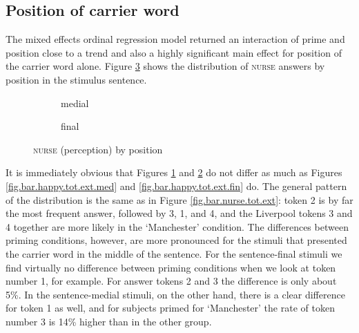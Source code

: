 \subsection{Position of carrier word}
\label{sec.perc_res.nurse.position}

The mixed effects ordinal regression model returned an interaction of prime and position close to a trend and also a highly significant main effect for position of the carrier word alone.
Figure \ref{fig.bar.nurse.tot.ext.pos} shows the distribution of \textsc{nurse} answers by position in the stimulus sentence.

\begin{figure}[h]
	\centering
	\begin{subfigure}{0.49\textwidth}
		\centering
			\resizebox{\linewidth}{!}{} 
		\caption{medial}
		\label{fig.bar.nurse.tot.ext.med}
	\end{subfigure}
	\begin{subfigure}{0.49\textwidth}
		\centering
			\resizebox{\linewidth}{!}{} 
		\caption{final}
		\label{fig.bar.nurse.tot.ext.fin}
	\end{subfigure}
	\caption{\textsc{nurse} (perception) by position}
	\label{fig.bar.nurse.tot.ext.pos}
\end{figure}

It is immediately obvious that Figures \ref{fig.bar.nurse.tot.ext.med} and \ref{fig.bar.nurse.tot.ext.fin} do not differ as much as Figures \ref{fig.bar.happy.tot.ext.med} and \ref{fig.bar.happy.tot.ext.fin} do.
The general pattern of the distribution is the same as in Figure \ref{fig.bar.nurse.tot.ext}: token 2 is by far the most frequent answer, followed by 3, 1, and 4, and the Liverpool tokens 3 and 4 together are more likely in the `Manchester' condition.
The differences between priming conditions, however, are more pronounced for the stimuli that presented the carrier word in the middle of the sentence.
For the sentence-final stimuli we find virtually no difference between priming conditions when we look at token number 1, for example.
For answer tokens 2 and 3 the difference is only about 5\%.
In the sentence-medial stimuli, on the other hand, there is a clear difference for token 1 as well, and for subjects primed for `Manchester' the rate of token number 3 is 14\% higher than in the other group.


